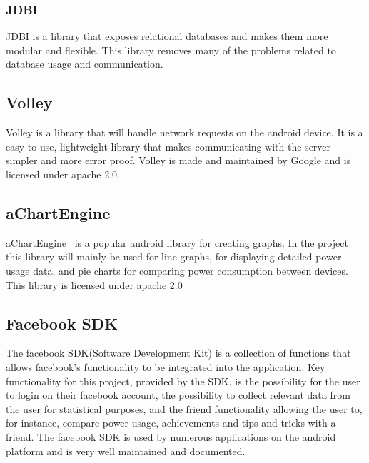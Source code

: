 \subsubsection{JDBI}
JDBI is a library that exposes relational databases and makes them more modular and flexible. This library removes many of the problems related to database usage and communication.

\subsection{Volley}
Volley is a library that will handle network requests on the android device. It is a easy-to-use, lightweight library that makes communicating with the server simpler and more error proof.  Volley is made and maintained by Google and is licensed under apache 2.0.

\subsection{aChartEngine}
aChartEngine~\cite{achart} is a popular android library for creating graphs. In the project this library will mainly be used for line graphs, for displaying detailed power usage data, and pie charts for comparing power consumption between devices. This library is licensed under apache 2.0

\subsection{Facebook SDK}
The facebook SDK(Software Development Kit) is a collection of functions that allows facebook’s functionality to be integrated into the application. Key functionality for this project, provided by the SDK, is the possibility for the user to login on their facebook account, the possibility to collect  relevant data from the user for statistical purposes, and the friend functionality allowing the user to, for instance, compare power usage, achievements and tips and tricks with a friend. The facebook SDK is used by numerous applications on the android platform and is very well maintained and documented. 
